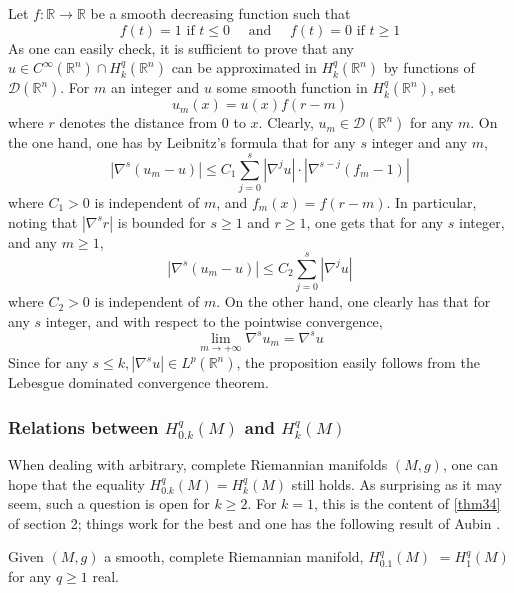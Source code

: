 \documentclass[12pt,hyperref,a4paper,UTF8]{ctexart}
\begin{document}
\begin{Proof}
    Let $f: \mathbb{R} \rightarrow \mathbb{R}$ be a smooth decreasing function such that
$$
f(t)=1 \text { if } t \leq 0 \quad\text { and }\quad f(t)=0 \text { if } t \geq 1
$$
As one can easily check, it is sufficient to prove that any $u \in C^{\infty}\left(\mathbb{R}^n\right) \cap H_k^q\left(\mathbb{R}^n\right)$ can be approximated in $H_k^q\left(\mathbb{R}^n\right)$ by functions of $\mathcal{D}\left(\mathbb{R}^n\right)$. For $m$ an integer and $u$ some smooth function in $H_k^q\left(\mathbb{R}^n\right)$, set
$$
u_m(x)=u(x) f(r-m)
$$
where $r$ denotes the distance from 0 to $x$. Clearly, $u_m \in \mathcal{D}\left(\mathbb{R}^n\right)$ for any $m$. On the one hand, one has by Leibnitz's formula that for any $s$ integer and any $m$,
$$
\left|\nabla^s\left(u_m-u\right)\right| \leq C_1 \sum_{j=0}^s\left|\nabla^j u\right| \cdot\left|\nabla^{s-j}\left(f_m-1\right)\right|
$$
where $C_1>0$ is independent of $m$, and $f_m(x)=f(r-m)$. In particular, noting that $\left|\nabla^s r\right|$ is bounded for $s \geq 1$ and $r \geq 1$, one gets that for any $s$ integer, and any $m \geq 1$,
$$
\left|\nabla^s\left(u_m-u\right)\right| \leq C_2 \sum_{j=0}^s\left|\nabla^j u\right|
$$
where $C_2>0$ is independent of $m$. On the other hand, one clearly has that for any $s$ integer, and with respect to the pointwise convergence,
$$
\lim _{m \rightarrow+\infty} \nabla^s u_m=\nabla^s u
$$
Since for any $s \leq k,\left|\nabla^s u\right| \in L^p\left(\mathbb{R}^n\right)$, the proposition easily follows from the Lebesgue dominated convergence theorem.
\end{Proof}

\subsubsection{Relations between $H_{0 . k}^q(M)$ and $H_k^q(M)$}
When dealing with arbitrary, complete Riemannian manifolds $(M, g)$, one can hope that the equality $H_{0 . k}^q(M)=H_k^q(M)$ still holds. As surprising as it may seem, such a question is open for $k \geq 2$. For $k=1$, this is the content of \autoref{thm34} of section 2; things work for the best and one has the following result of Aubin \cite{Aubin-}.

\begin{Theorem}
    Given $(M, g)$ a smooth, complete Riemannian manifold, $H_{0.1}^q(M)$ $=H_1^q(M)$ for any $q \geq 1$ real.
\label{thm41}
\end{Theorem}
\end{document}
